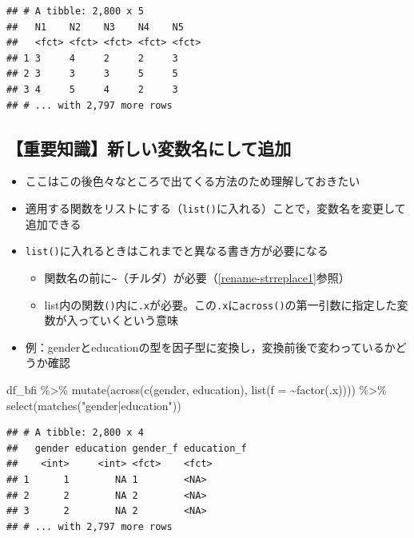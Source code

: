 \documentclass[
  xelatex,ja=standard, b5paper]{bxjsbook}
\newenvironment{Shaded}{\begin{snugshade}}{\end{snugshade}}
\newcommand{\AttributeTok}[1]{\textcolor[rgb]{0.77,0.63,0.00}{#1}}
\newcommand{\FunctionTok}[1]{\textcolor[rgb]{0.00,0.00,0.00}{#1}}
\newcommand{\NormalTok}[1]{#1}
\newcommand{\SpecialCharTok}[1]{\textcolor[rgb]{0.00,0.00,0.00}{#1}}
\newcommand{\StringTok}[1]{\textcolor[rgb]{0.31,0.60,0.02}{#1}}
\providecommand{\tightlist}{%
  \setlength{\itemsep}{0pt}\setlength{\parskip}{0pt}}
\begin{document}
\begin{verbatim}
## # A tibble: 2,800 x 5
##   N1    N2    N3    N4    N5   
##   <fct> <fct> <fct> <fct> <fct>
## 1 3     4     2     2     3    
## 2 3     3     3     5     5    
## 3 4     5     4     2     3    
## # ... with 2,797 more rows
\end{verbatim}

\hypertarget{mu-across-list}{%
\subsection{【重要知識】新しい変数名にして追加}\label{mu-across-list}}

\begin{itemize}
\tightlist
\item
  ここはこの後色々なところで出てくる方法のため理解しておきたい
\item
  適用する関数をリストにする（\texttt{list()}に入れる）ことで，変数名を変更して追加できる
\item
  \texttt{list()}に入れるときはこれまでと異なる書き方が必要になる

  \begin{itemize}
  \tightlist
  \item
    関数名の前に\texttt{\textasciitilde{}}（チルダ）が必要（\ref{rename-strreplace1}参照）
  \item
    list内の関数\texttt{()}内に\texttt{.x}が必要。この\texttt{.x}に\texttt{across()}の第一引数に指定した変数が入っていくという意味
  \end{itemize}
\item
  例：genderとeducationの型を因子型に変換し，変換前後で変わっているかどうか確認
\end{itemize}

\begin{Shaded}
\begin{Highlighting}[]
\NormalTok{df\_bfi }\SpecialCharTok{\%\textgreater{}\%}
  \FunctionTok{mutate}\NormalTok{(}\FunctionTok{across}\NormalTok{(}\FunctionTok{c}\NormalTok{(gender, education),}
                \FunctionTok{list}\NormalTok{(}\AttributeTok{f =} \SpecialCharTok{\textasciitilde{}}\FunctionTok{factor}\NormalTok{(.x)))) }\SpecialCharTok{\%\textgreater{}\%} 
  \FunctionTok{select}\NormalTok{(}\FunctionTok{matches}\NormalTok{(}\StringTok{"gender|education"}\NormalTok{))   }
\end{Highlighting}
\end{Shaded}

\begin{verbatim}
## # A tibble: 2,800 x 4
##   gender education gender_f education_f
##    <int>     <int> <fct>    <fct>      
## 1      1        NA 1        <NA>       
## 2      2        NA 2        <NA>       
## 3      2        NA 2        <NA>       
## # ... with 2,797 more rows
\end{verbatim}
\end{document}
